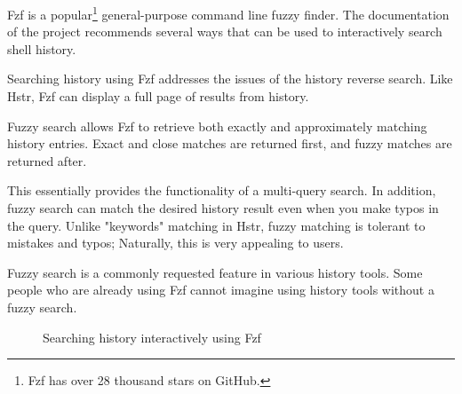 Fzf\cite{tools-fzf} is a popular\footnote{Fzf has over 28 thousand stars on GitHub.} general-purpose command line fuzzy finder. The documentation of the project recommends several ways that can be used to interactively search shell history.

Searching history using Fzf addresses the issues of the history reverse search. 
Like Hstr, Fzf can display a full page of results from history. 

Fuzzy search allows Fzf to retrieve both exactly and approximately matching history entries. Exact and close matches are returned first, and fuzzy matches are returned after. 

This essentially provides the functionality of a multi-query search. In addition, fuzzy search can match the desired history result even when you make typos in the query. Unlike "keywords" matching in Hstr, fuzzy matching is tolerant to mistakes and typos; Naturally, this is very appealing to users. 

Fuzzy search is a commonly requested feature in various history tools. Some people who are already using Fzf cannot imagine using history tools without a fuzzy search.


\begin{figure}
  \caption{Searching history interactively using Fzf}
\end{figure}



